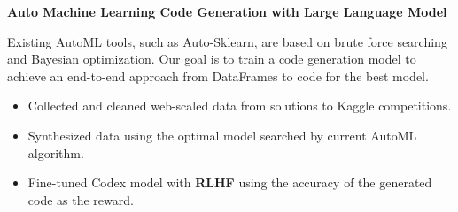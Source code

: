 \documentclass[letterpaper,11pt]{article}
\newcommand{\resumeItem}[1]{
  \item\small{
    {\raggedright #1 \vspace{-2pt}}
  }
}
\begin{document}
      \resumeItem{
        \textbf{Auto Machine Learning Code Generation with Large Language Model} 
        
        Existing AutoML tools, such as Auto-Sklearn, are based on brute force searching and Bayesian optimization. Our goal is to train a code generation model to achieve an end-to-end approach from DataFrames to code for the best model.
        \vspace*{-2pt}
        \begin{itemize}[leftmargin=*]
          \item Collected and cleaned web-scaled data from solutions to Kaggle competitions.
          \item Synthesized data using the optimal model searched by current AutoML algorithm.
          \item Fine-tuned Codex model with \textbf{RLHF} using the accuracy of the generated code as the reward.
        \end{itemize}
      }
\end{document}

